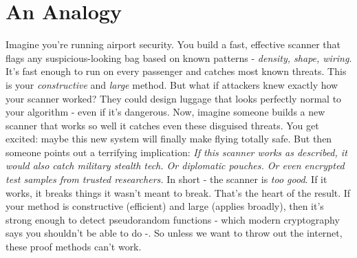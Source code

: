 \documentclass[12pt]{report}
\begin{document}
\section{An Analogy}
Imagine you're running airport security.  
You build a fast, effective scanner that flags any suspicious-looking bag based on known patterns - \textit{density, shape, wiring}.
It's fast enough to run on every passenger and catches most known threats.
This is your \textit{constructive} and \textit{large} method.
But what if attackers knew exactly how your scanner worked?  
They could design luggage that looks perfectly normal to your algorithm - even if it's dangerous.
Now, imagine someone builds a new scanner that works so well it catches even these disguised threats.
You get excited: maybe this new system will finally make flying totally safe.
But then someone points out a terrifying implication:  
\textit{If this scanner works as described, it would also catch military stealth tech. Or diplomatic pouches. Or even encrypted test samples from trusted researchers.}
In short - the scanner is \textit{too good}.  
If it works, it breaks things it wasn't meant to break.
That's the heart of the \cite{razborov1994} result.
If your method is constructive (efficient) and large (applies broadly), then it's strong enough to detect pseudorandom functions - which modern cryptography says you shouldn't be able to do -\cite{arora2009}.  
So unless we want to throw out the internet, these proof methods can't work.
\end{document}
